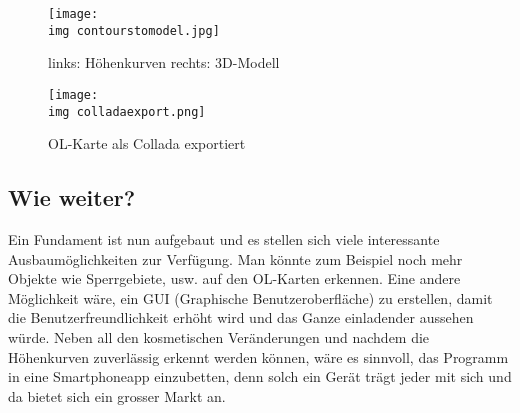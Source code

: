 \begin{figure}[hbt]
	\centering
	\texttt{[image: \\img contourstomodel.jpg]}
	\caption{links: Höhenkurven rechts: 3D-Modell}
	\label{fig:courvecompare}
\end{figure}

\begin{figure}[hbt]
	\centering
	\texttt{[image: \\img colladaexport.png]}
	\caption{OL-Karte als Collada exportiert}
	\label{fig:colladaexample}
\end{figure}

\subsection{Wie weiter?}

Ein Fundament ist nun aufgebaut und es stellen sich viele interessante Ausbaumöglichkeiten zur Verfügung. Man könnte zum Beispiel noch mehr Objekte wie Sperrgebiete, usw. auf den OL-Karten erkennen. Eine andere Möglichkeit wäre, ein GUI (Graphische Benutzeroberfläche) zu erstellen, damit die Benutzerfreundlichkeit erhöht wird und das Ganze einladender aussehen würde. Neben all den kosmetischen Veränderungen und nachdem die Höhenkurven zuverlässig erkennt werden können, wäre es sinnvoll, das Programm in eine Smartphoneapp einzubetten, denn solch ein Gerät trägt jeder mit sich und da bietet sich ein grosser Markt an.
